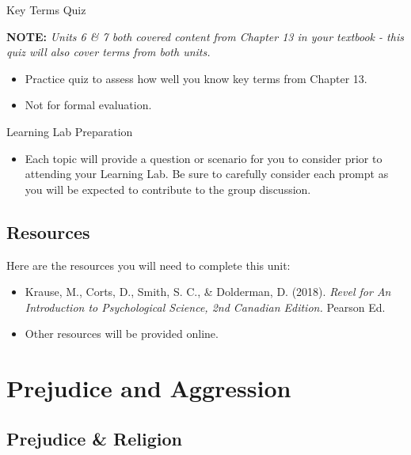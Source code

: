 \documentclass[
]{book}
\providecommand{\tightlist}{%
  \setlength{\itemsep}{0pt}\setlength{\parskip}{0pt}}
\begin{document}
\begin{reflect}
{Key Terms Quiz}

\textbf{NOTE:} \emph{Units 6 \& 7 both covered content from Chapter 13 in your textbook - this quiz will also cover terms from both units.}

\begin{itemize}
\tightlist
\item
  Practice quiz to assess how well you know key terms from Chapter 13.\\
\item
  Not for formal evaluation.
\end{itemize}

{Learning Lab Preparation}

\begin{itemize}
\tightlist
\item
  Each topic will provide a question or scenario for you to consider prior to attending your Learning Lab. Be sure to carefully consider each prompt as you will be expected to contribute to the group discussion.
\end{itemize}
\end{reflect}

\hypertarget{resources-8}{%
\subsection*{Resources}\label{resources-8}}

Here are the resources you will need to complete this unit:

\begin{itemize}
\tightlist
\item
  Krause, M., Corts, D., Smith, S. C., \& Dolderman, D. (2018). \emph{Revel for An Introduction to Psychological Science, 2nd Canadian Edition.} Pearson Ed.\\
\item
  Other resources will be provided online.
\end{itemize}

\hypertarget{prejudice-and-aggression}{%
\section{Prejudice and Aggression}\label{prejudice-and-aggression}}

\hypertarget{prejudice-religion}{%
\subsection*{Prejudice \& Religion}\label{prejudice-religion}}
\end{document}
